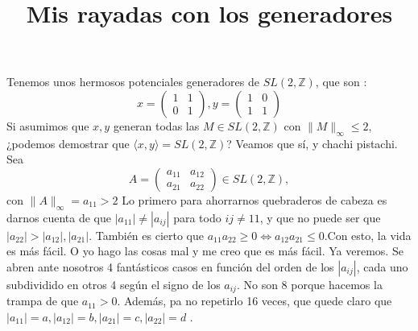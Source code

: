 \documentclass{article}
\title{Mis rayadas con los generadores}
\newcommand\tab[1][0.6cm]{\hspace*{#1}}
\newcommand\nl{\newline\tab}
\begin{document}
	\maketitle
	Tenemos unos hermosos potenciales generadores de $ SL(2, \mathbb{Z}) $, que son : 
	$$
	x = 
	\begin{pmatrix}
	1 & 1 \\
	0 & 1 
	\end{pmatrix},	
	y = 
	\begin{pmatrix}
	1 & 0 \\
	1 & 1 
	\end{pmatrix}
	$$
	\nl
	Si asumimos que $x, y$ generan todas las $M \in SL(2, \mathbb{Z}) $ con  $ \| M \|_\infty \leq 2 $, ¿podemos demostrar que $\langle x, y \rangle =  SL(2, \mathbb{Z})$? \nl
	Veamos que sí, y chachi pistachi. 
	Sea $$
	A = 
	\begin{pmatrix}
	a_{11} & a_{12} \\
	a_{21} & a_{22} 
	\end{pmatrix} \in SL(2, \mathbb{Z}), $$ con  $ \| A \|_\infty = a_{11} > 2
	$ \nl 
	Lo primero para ahorrarnos quebraderos de cabeza es darnos cuenta de que  $|a_{11}| \neq |a_{ij}|$ para todo $ij \neq 11$, y que no puede ser que $ |a_{22}| > |a_{12}|, |a_{21}|$. También es cierto que $a_{11}a_{22}\geq 0 \iff a_{12}a_{21}\leq 0$.\nl Con esto, la vida es más fácil. \nl
	O yo hago las cosas mal y me creo que es más fácil. Ya veremos. \nl
	Se abren ante nosotros 4 fantásticos casos en función del orden de los $|a_{ij}|$, cada uno subdividido en otros 4 según el signo de los $a_{ij}$. No son 8 porque hacemos la trampa de que $a_{11} > 0$. \nl
	Además, pa no repetirlo 16 veces, que quede claro que  $|a_{11}| = a, |a_{12}| = b, |a_{21}| = c, |a_{22}| = d $	.
\end{document}
